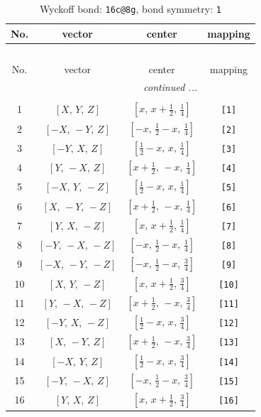 \documentclass[fleqn,8pt]{jsarticle}
\begin{document}
\begin{longtable}{cccc}
\caption{Wyckoff bond: {\tt 16c@8g}, bond symmetry: {\tt 1}}
 \\
 \hline \hline
No. & vector & center & mapping \\ \hline \endfirsthead

\multicolumn{3}{l}{\tablename\ \thetable{}} \\
 \hline \hline
No. & vector & center & mapping \\ \hline \endhead

 \hline \hline
\multicolumn{3}{r}{\footnotesize\it continued ...} \\ \endfoot

 \hline \hline
\multicolumn{3}{r}{} \\ \endlastfoot

1 & $\left[ X,\, Y,\, Z \right]$ & $\left[ x,\, x + \frac{1}{2},\, \frac{1}{4} \right]$ & {\tt [1]} \\ \hline
2 & $\left[ - X,\, - Y,\, Z \right]$ & $\left[ - x,\, \frac{1}{2} - x,\, \frac{1}{4} \right]$ & {\tt [2]} \\ \hline
3 & $\left[ - Y,\, X,\, Z \right]$ & $\left[ \frac{1}{2} - x,\, x,\, \frac{1}{4} \right]$ & {\tt [3]} \\ \hline
4 & $\left[ Y,\, - X,\, Z \right]$ & $\left[ x + \frac{1}{2},\, - x,\, \frac{1}{4} \right]$ & {\tt [4]} \\ \hline
5 & $\left[ - X,\, Y,\, - Z \right]$ & $\left[ \frac{1}{2} - x,\, x,\, \frac{1}{4} \right]$ & {\tt [5]} \\ \hline
6 & $\left[ X,\, - Y,\, - Z \right]$ & $\left[ x + \frac{1}{2},\, - x,\, \frac{1}{4} \right]$ & {\tt [6]} \\ \hline
7 & $\left[ Y,\, X,\, - Z \right]$ & $\left[ x,\, x + \frac{1}{2},\, \frac{1}{4} \right]$ & {\tt [7]} \\ \hline
8 & $\left[ - Y,\, - X,\, - Z \right]$ & $\left[ - x,\, \frac{1}{2} - x,\, \frac{1}{4} \right]$ & {\tt [8]} \\ \hline
9 & $\left[ - X,\, - Y,\, - Z \right]$ & $\left[ - x,\, \frac{1}{2} - x,\, \frac{3}{4} \right]$ & {\tt [9]} \\ \hline
10 & $\left[ X,\, Y,\, - Z \right]$ & $\left[ x,\, x + \frac{1}{2},\, \frac{3}{4} \right]$ & {\tt [10]} \\ \hline
11 & $\left[ Y,\, - X,\, - Z \right]$ & $\left[ x + \frac{1}{2},\, - x,\, \frac{3}{4} \right]$ & {\tt [11]} \\ \hline
12 & $\left[ - Y,\, X,\, - Z \right]$ & $\left[ \frac{1}{2} - x,\, x,\, \frac{3}{4} \right]$ & {\tt [12]} \\ \hline
13 & $\left[ X,\, - Y,\, Z \right]$ & $\left[ x + \frac{1}{2},\, - x,\, \frac{3}{4} \right]$ & {\tt [13]} \\ \hline
14 & $\left[ - X,\, Y,\, Z \right]$ & $\left[ \frac{1}{2} - x,\, x,\, \frac{3}{4} \right]$ & {\tt [14]} \\ \hline
15 & $\left[ - Y,\, - X,\, Z \right]$ & $\left[ - x,\, \frac{1}{2} - x,\, \frac{3}{4} \right]$ & {\tt [15]} \\ \hline
16 & $\left[ Y,\, X,\, Z \right]$ & $\left[ x,\, x + \frac{1}{2},\, \frac{3}{4} \right]$ & {\tt [16]} \\
\end{longtable}
\end{document}
